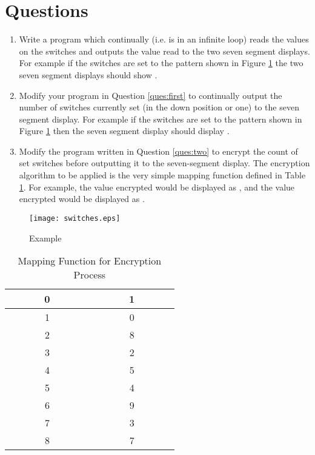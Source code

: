 \documentclass[a4paper,10pt]{article}
\begin{document}
\section{Questions}
\begin{enumerate}
\item\label{ques:first} Write a program which continually (i.e. is in
an infinite loop) reads the values on the switches and outputs the
value read to the two seven segment displays.  For example if the
switches are set to the pattern shown in Figure \ref{fig:switches} the
two seven segment displays should show .

\item\label{ques:two} Modify your program in Question \ref{ques:first}
to continually output the number of switches currently set (in the
down position or one) to the seven segment display. For example if the
switches are set to the pattern shown in Figure \ref{fig:switches}
then the seven segment display should display .

\item\label{ques:final} Modify the program written in Question
\ref{ques:two} to encrypt the count of set switches before outputting
it to the seven-segment display. The encryption algorithm to be
applied is the very simple mapping function defined in Table
\ref{table:encode}. For example, the value  encrypted would be
displayed as , and the value  encrypted would be
displayed as .
\end{enumerate}

\begin{figure}[!hb]
\begin{center}
\texttt{[image: switches.eps]}
\caption{Example}
\label{fig:switches}
\end{center}
\end{figure}


\begin{table}
\begin{center}
\begin{tabular}{|c|c|}
\hline
\verb|       |0\verb|       | & \verb|       |1\verb|       | \\ \hline
1 & 0 \\ \hline
2 & 8 \\ \hline
3 & 2 \\ \hline
4 & 5 \\ \hline
5 & 4 \\ \hline
6 & 9 \\ \hline
7 & 3 \\ \hline
8 & 7 \\ 
\hline
\end{tabular}
\end{center}
\label{table:encode}
\caption{Mapping Function for Encryption Process}
\end{table}






\thispagestyle{rcsfooters}
\pagestyle{rcsfooters}
\end{document}

